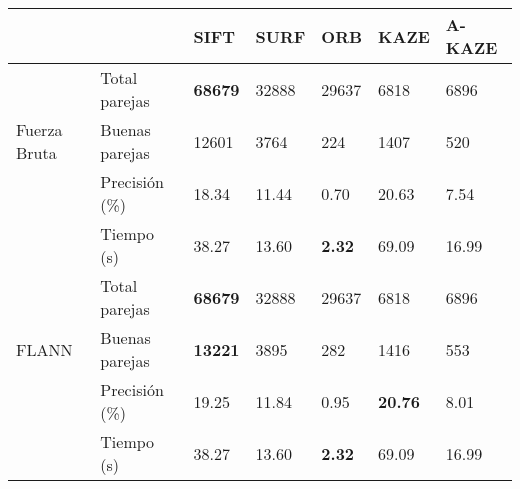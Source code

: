 \begin{table}[h]
	\centering
	\label{0234}
	\renewcommand{\arraystretch}{0.8}%
	\begin{tabular}{@{}lllllll@{}}
		\toprule
			 &                				& SIFT 			& SURF & ORB 			& KAZE 				& A-KAZE \\ \midrule 
		       \hfill\vline& Total parejas  & \textbf{68679}& 32888&29637			& 6818 				& 6896   \\
		Fuerza Bruta \vline& Buenas parejas & 12601			& 3764 & 224 			& 1407 				& 520    \\
			   \hfill\vline& Precisión (\%) & 18.34			&11.44 &0.70 			&20.63 				& 7.54  \\
			   \vspace{0.3cm}
			   \hfill\vline& Tiempo (s)     & 38.27			&13.60 &\textbf{2.32}	&69.09 				& 16.99  \\
			   
			   \hfill\vline& Total parejas  & \textbf{68679}& 32888&29637			& 6818 				& 6896   \\
		FLANN  \hfill\vline& Buenas parejas &\textbf{13221} & 3895 & 282 			& 1416 				&553     \\ 
			   \hfill\vline& Precisión (\%) & 19.25			& 11.84& 0.95			& \textbf{20.76}	& 8.01 \\ 
			   \hfill\vline& Tiempo (s)     & 38.27			&13.60 &\textbf{2.32} 	&69.09 				& 16.99  \\
			   \bottomrule
	\end{tabular}
\end{table}


